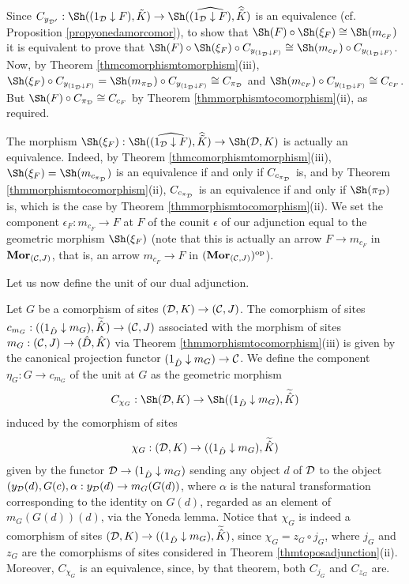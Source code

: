 \documentclass[a4paper,12pt]{article}
\begin{document}
\begin{proofs}
	Since $C_{y_{{\cal D}'}}:\Sh((1_{\cal D}\downarrow F), \tilde{K})\to \Sh(\widehat{(1_{\cal D}\downarrow F)}, \widehat{\tilde{K}})$ is an equivalence (cf. Proposition \ref{propyonedamorcomor}), to show that $\Sh(F)\circ \Sh(\xi_{F})\cong \Sh(m_{c_{F}})$ it is equivalent to prove that $\Sh(F)\circ \Sh(\xi_{F})\circ C_{y_{(1_{\cal D}\downarrow F)}} \cong \Sh(m_{c_{F}})\circ C_{y_{(1_{\cal D}\downarrow F)}}$. Now, by Theorem \ref{thmcomorphismtomorphism}(iii), $\Sh(\xi_{F})\circ C_{y_{(1_{\cal D}\downarrow F)}}=\Sh(m_{\pi_{\cal D}})\circ C_{y_{(1_{\cal D}\downarrow F)}} \cong C_{\pi_{\cal D}}$ and $\Sh(m_{c_{F}})\circ C_{y_{(1_{\cal D}\downarrow F)}}\cong C_{c_{F}}$. But $\Sh(F)\circ C_{\pi_{\cal D}}\cong C_{c_{F}}$ by Theorem \ref{thmmorphismtocomorphism}(ii), as required.
	
	The morphism $\Sh(\xi_{F}):\Sh(\widehat{(1_{\cal D}\downarrow F)}, \widehat{\tilde{K}})\to \Sh({\cal D}, K)$ is actually an equivalence. Indeed, by Theorem \ref{thmcomorphismtomorphism}(iii), $\Sh(\xi_{F})=\Sh(m_{c_{\pi_{\cal D}}})$ is an equivalence if and only if $C_{c_{\pi_{\cal D}}}$ is, and by Theorem \ref{thmmorphismtocomorphism}(ii), $C_{c_{\pi_{\cal D}}}$ is an equivalence if and only if $\Sh(\pi_{\cal D})$ is, which is the case by Theorem \ref{thmmorphismtocomorphism}(ii). We set the component $\epsilon_{F}:m_{c_{F}} \to F$ at $F$ of the counit $\epsilon$ of our adjunction equal to the geometric morphism $\Sh(\xi_{F})$ (note that this is actually an arrow $F\to m_{c_{F}}$ in ${\textup{\bf Mor}}_{({\cal C}, J)}$, that is, an arrow $m_{c_{F}} \to F$ in $({\textup{\bf Mor}}_{({\cal C}, J)})^{\textup{op}}$).
	
	Let us now define the unit of our dual adjunction.
	
	Let $G$ be a comorphism of sites $({\cal D}, K)\to ({\cal C}, J)$. The comorphism of sites $c_{m_{G}}:((1_{\hat{D}}\downarrow m_{G}), \widetilde{\hat{K}})\to ({\cal C}, J)$ associated with the morphism of sites $m_{G}:({\cal C}, J)\to (\hat{D}, \hat{K})$ via Theorem \ref{thmmorphismtocomorphism}(iii)  is given by the canonical projection functor $(1_{\hat{D}}\downarrow m_{G}) \to {\cal C}$. We define the component $\eta_{G}:G\to c_{m_{G}}$ of the unit at $G$ as the geometric morphism
	\[
	C_{\chi_{G}}:\Sh({\cal D}, K)\to \Sh((1_{\hat{D}}\downarrow m_{G}), \widetilde{\hat{K}})
	\]
	induced by the comorphism of sites 
	\[
	\chi_{G}:({\cal D}, K)\to ((1_{\hat{D}}\downarrow m_{G}), \widetilde{\hat{K}})
	\] 
	given by the functor ${\cal D}\to (1_{\hat{D}}\downarrow m_{G})$ sending any object $d$ of $\cal D$ to the object $(y_{\cal D}(d), G(c), \alpha:y_{\cal D}(d)\to m_{G}(G(d))$, where $\alpha$ is the natural transformation corresponding to the identity on $G(d)$, regarded as an element of $m_{G}(G(d))(d)$, via the Yoneda lemma. Notice that $\chi_{G}$ is indeed a comorphism of sites $({\cal D}, K)\to ((1_{\hat{D}}\downarrow m_{G}), \widetilde{\hat{K}})$, since $\chi_{G}=z_{G}\circ j_{G}$, where $j_{G}$ and $z_{G}$ are the comorphisms of sites considered in Theorem \ref{thmtoposadjunction}(ii). Moreover, $C_{\chi_{G}}$ is an equivalence, since, by that theorem, both $C_{j_{G}}$ and $C_{z_{G}}$ are.
	

\end{proofs}
\end{document}
